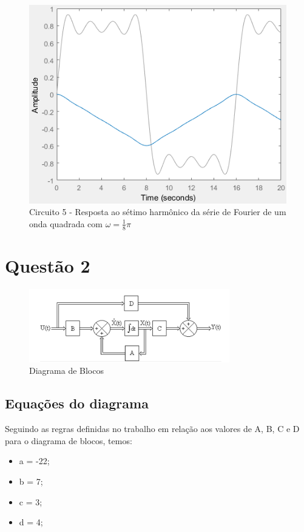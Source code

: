 \documentclass[a4paper, 12pt]{article}
\begin{document}
			\begin{figure}[!ht]
				\centering
				\includegraphics[scale=0.71]{img/1m_circ5.png}
				\caption{Circuito 5 - Resposta ao sétimo harmônico da série de Fourier de um onda quadrada com $\omega = \frac{1}{8}\pi$}
			\end{figure}

	\clearpage
	\section{Quest\~{a}o 2}

	\begin{figure}[!ht]
		\centering
        \includegraphics{img/db.png}
		\caption{Diagrama de Blocos}
	\end{figure}
	\subsection{Equações do diagrama}
	Seguindo as regras definidas no trabalho em relação aos valores de A, B, C e D para o diagrama de blocos, temos:
		\begin{itemize}
			\item a = -22;
			\item b = 7;
			\item c = 3;
			\item d = 4;
		\end{itemize}
\end{document}
